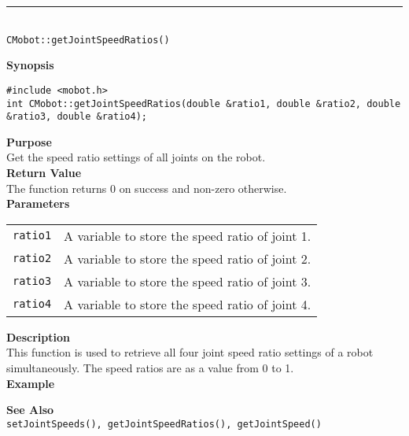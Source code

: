 \noindent
\vspace{5pt}
\rule{4.5in}{0.015in}\\
\noindent
{\LARGE \texttt{CMobot::getJointSpeedRatios()}}\\
{}

\noindent
{\bf Synopsis}
\vspace{-8pt}
\begin{verbatim}
#include <mobot.h>
int CMobot::getJointSpeedRatios(double &ratio1, double &ratio2, double &ratio3, double &ratio4);
\end{verbatim}

\noindent
{\bf Purpose}\\
Get the speed ratio settings of all joints on the robot.\\

\noindent
{\bf Return Value}\\
The function returns 0 on success and non-zero otherwise.\\

\noindent
{\bf Parameters}
\vspace{-0.1in}
\begin{description}
\item               
\begin{tabular}{p{10 mm}p{145 mm}}
\texttt{ratio1} & A variable to store the speed ratio of joint 1.\\
\texttt{ratio2} & A variable to store the speed ratio of joint 2.\\
\texttt{ratio3} & A variable to store the speed ratio of joint 3.\\
\texttt{ratio4} & A variable to store the speed ratio of joint 4.\\
\end{tabular}
\end{description}

\noindent
{\bf Description}\\
This function is used to retrieve all four joint speed ratio settings of a robot
simultaneously. The speed ratios are as a value from 0 to 1. \\

\noindent
{\bf Example}\\
\noindent

\noindent
{\bf See Also}\\
\texttt{setJointSpeeds(), getJointSpeedRatios(), getJointSpeed()}

